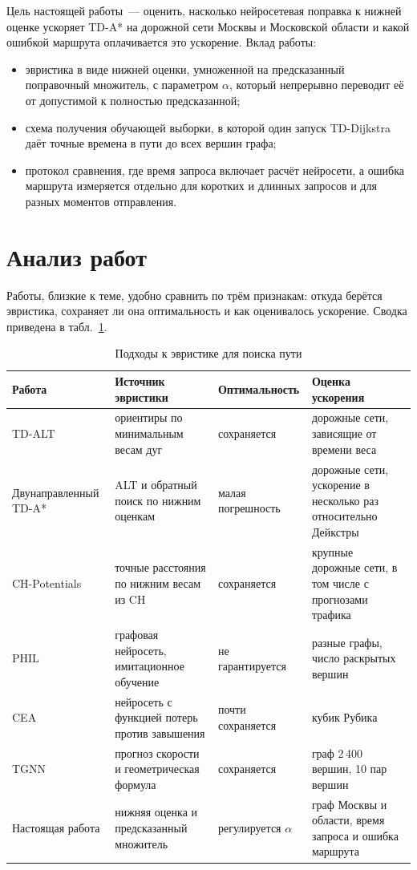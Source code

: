 \documentclass{misisarticle}
\begin{document}
Цель настоящей работы~--- оценить, насколько нейросетевая поправка к нижней оценке ускоряет TD-A* на дорожной сети Москвы и Московской области и какой ошибкой маршрута оплачивается это ускорение. Вклад работы:
\begin{itemize}
  \item эвристика в виде нижней оценки, умноженной на предсказанный поправочный множитель, с параметром $\alpha$, который непрерывно переводит её от допустимой к полностью предсказанной;
  \item схема получения обучающей выборки, в которой один запуск TD-Dijkstra даёт точные времена в пути до всех вершин графа;
  \item протокол сравнения, где время запроса включает расчёт нейросети, а ошибка маршрута измеряется отдельно для коротких и длинных запросов и для разных моментов отправления.
\end{itemize}

\section{Анализ работ}

Работы, близкие к теме, удобно сравнить по трём признакам: откуда берётся эвристика, сохраняет ли она оптимальность и как оценивалось ускорение. Сводка приведена в табл.~\ref{tab:related}.

\begin{table}[htbp]
  \caption{Подходы к эвристике для поиска пути}
  \label{tab:related}
  \centering
  \begin{tabular}{>{\raggedright\arraybackslash}p{3.1cm}>{\raggedright\arraybackslash}p{4.4cm}>{\raggedright\arraybackslash}p{3.0cm}>{\raggedright\arraybackslash}p{5.6cm}}
    \toprule
    \textbf{Работа} & \textbf{Источник эвристики} & \textbf{Оптимальность} & \textbf{Оценка ускорения} \\
    \midrule
    TD-ALT~\cite{delling2007} & ориентиры по минимальным весам дуг & сохраняется & дорожные сети, зависящие от времени веса \\
    Двунаправленный TD-A*~\cite{nannicini2012} & ALT и обратный поиск по нижним оценкам & малая погрешность & дорожные сети, ускорение в несколько раз относительно Дейкстры \\
    CH-Potentials~\cite{strasser2019} & точные расстояния по нижним весам из CH & сохраняется & крупные дорожные сети, в том числе с прогнозами трафика \\
    PHIL~\cite{pandy2022} & графовая нейросеть, имитационное обучение & не гарантируется & разные графы, число раскрытых вершин \\
    CEA~\cite{futuhi2025} & нейросеть с функцией потерь против завышения & почти сохраняется & кубик Рубика \\
    TGNN~\cite{liashenko2026} & прогноз скорости и геометрическая формула & сохраняется & граф 2\,400 вершин, 10 пар вершин \\
    Настоящая работа & нижняя оценка и предсказанный множитель & регулируется $\alpha$ & граф Москвы и области, время запроса и ошибка маршрута \\
    \bottomrule
  \end{tabular}
\end{table}
\end{document}
